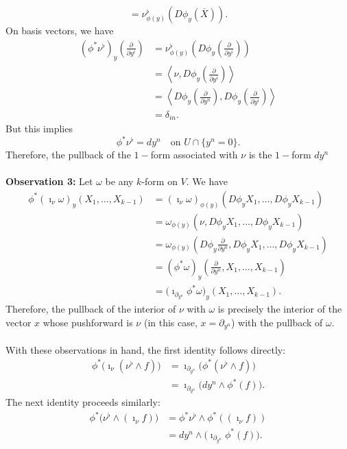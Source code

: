 {\begin{equation}
    =\nu^\flat_{\phi(y)}(D\phi_y(\overline{X})).
\end{equation}
On basis vectors, we have
\begin{align}
    (\phi^*\nu^\flat)_y\left(\frac{\partial}{\partial y^i}\right)
    &=\nu^\flat_{\phi(y)}
    \left(D\phi_y\left(\frac{\partial}{\partial y^i}\right)\right)\\
    &=\left\langle
    \nu,D\phi_y\left(\frac{\partial}{\partial y^i}\right)
    \right\rangle \nonumber\\
    &=\left\langle
    D\phi_y\left(\frac{\partial}{\partial y^n}\right),
    D\phi_y\left(\frac{\partial}{\partial y^i}\right)
    \right\rangle \nonumber\\
    &=\delta_{in}. \nonumber
\end{align}
But this implies
\begin{equation*}
    {
    \phi^*\nu^\flat=dy^n
    \quad\text{on }U\cap\{y^n=0\}.
    }
\end{equation*}
Therefore, the pullback of the $1-$form associated with $\nu$ is the $1-$form $dy^n$
\\\\\textbf{Observation 3:} Let $\omega$ be any $k$-form on $V$. We have
\begin{align*}
    \phi^*(\imath_\nu\omega)_y(X_1,\ldots,X_{k-1})
    &=(\imath_\nu\omega)_{\phi(y)}
    (D\phi_yX_1,\ldots,D\phi_yX_{k-1})\\
    &=\omega_{\phi(y)}
    (\nu,D\phi_yX_1,\ldots,D\phi_yX_{k-1})\\
    &=\omega_{\phi(y)}
    \left(
    D\phi_y\frac{\partial}{\partial y^n},
    D\phi_yX_1,\ldots,D\phi_yX_{k-1}
    \right)\\
    &=(\phi^*\omega)_y
    \left(\frac{\partial}{\partial y^n},
    X_1,\ldots,X_{k-1}\right)\\
    &=\big(\imath_{\partial_{y^n}}\phi^*\omega\big)_y
    (X_1,\ldots,X_{k-1}).
\end{align*}
Therefore, the pullback of the interior of $\nu$ with $\omega$ is precisely the interior of the vector $x$ whose pushforward is $\nu$ (in this case, $x=\partial_{y^n}$) with the pullback of $\omega$. 
\\\\ With these observations in hand, the first identity follows directly:
\begin{align*}
    \phi^*\big(\imath_\nu(\nu^\flat\wedge f)\big)
    &=\imath_{\partial_{y^n}}
    \big(\phi^*(\nu^\flat\wedge f)\big)\\
    &=\imath_{\partial_{y^n}}
    \big(dy^n\wedge\phi^*(f)\big).
\end{align*}
The next identity proceeds similarly:
\begin{align*}
    \phi^*\big(\nu^\flat\wedge(\imath_\nu f)\big)
    &=\phi^*\nu^\flat\wedge\phi^*((\imath_\nu f))\\
    &=dy^n\wedge
    \big(\imath_{\partial_{y^n}}\phi^*(f)\big).
\end{align*}
}
